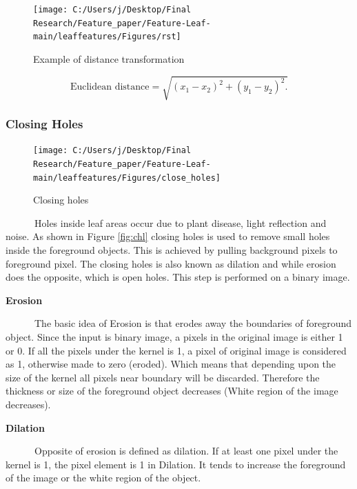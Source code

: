 \documentclass{article}
\begin{document}
\begin{figure}[!ht]

{\centering \texttt{[image: C:/Users/j/Desktop/Final Research/Feature\_paper/Feature-Leaf-main/leaffeatures/Figures/rst]} 

}

\caption{\label{fig:rstex}Example of distance transformation}\label{fig:unnamed-chunk-8}
\end{figure}

\begin{equation}
    \text{Euclidean distance} = \sqrt{(x_1 - x_2)^2 + (y_1 - y_2)^2.}
    \label{eu}
\end{equation}

\hypertarget{closing-holes}{%
\subsubsection{Closing Holes}\label{closing-holes}}

\begin{figure}[!ht]

{\centering \texttt{[image: C:/Users/j/Desktop/Final Research/Feature\_paper/Feature-Leaf-main/leaffeatures/Figures/close\_holes]} 

}

\caption{\label{fig:chl}Closing holes}\label{fig:unnamed-chunk-9}
\end{figure}

~~~~~~Holes inside leaf areas occur due to plant disease, light
reflection and noise. As shown in Figure \ref{fig:chl} closing holes is
used to remove small holes inside the foreground objects. This is
achieved by pulling background pixels to foreground pixel. The closing
holes is also known as dilation and while erosion does the opposite,
which is open holes. This step is performed on a binary image.

\textbf{Erosion}

~~~~~~The basic idea of Erosion is that erodes away the boundaries of
foreground object. Since the input is binary image, a pixels in the
original image is either 1 or 0. If all the pixels under the kernel is
1, a pixel of original image is considered as 1, otherwise made to zero
(eroded). Which means that depending upon the size of the kernel all
pixels near boundary will be discarded. Therefore the thickness or size
of the foreground object decreases (White region of the image
decreases).

\textbf{Dilation}

~~~~~~Opposite of erosion is defined as dilation. If at least one pixel
under the kernel is 1, the pixel element is 1 in Dilation. It tends to
increase the foreground of the image or the white region of the object.
\end{document}
